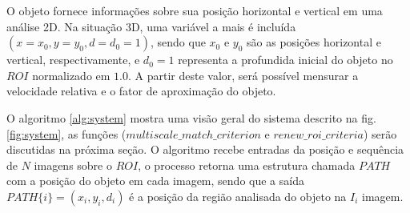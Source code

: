 O objeto fornece informações sobre sua posição horizontal e vertical em uma análise 2D. Na situação 
3D, uma variável a mais é incluída $(x=x_0, y=y_0, d=d_0=1)$, sendo que $x_0$ e $y_0$ são as posições 
horizontal e vertical, respectivamente, e $d_0=1$ representa a profundida inicial do objeto no $ROI$ normalizado em $1.0$. A partir
deste valor, será possível mensurar a velocidade relativa e o fator de aproximação do objeto.

O algoritmo \ref{alg:system} mostra uma visão geral do sistema descrito na fig. \ref{fig:system}, as funções 
 ($multiscale\_match\_criterion$ e $renew\_roi\_criteria$) serão discutidas na próxima seção. 
O algoritmo recebe entradas da posição e sequência de $N$ imagens sobre o $ROI$, o processo retorna 
uma estrutura chamada $PATH$ com a posição do objeto em cada imagem, sendo que a saída $PATH\{i\}=(x_i,y_i,d_i)$
é a posição da região analisada do objeto na $I_i$ imagem.

